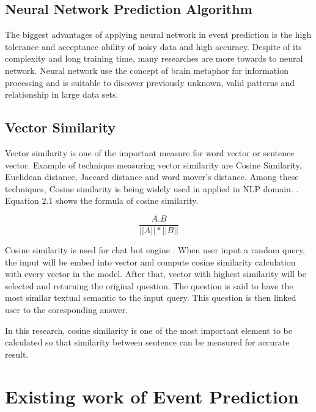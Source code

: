\documentclass[twoside]{utmthesis}
\begin{document}
\subsection{Neural Network Prediction Algorithm}
The biggest advantages of applying neural network in event prediction is the high tolerance and acceptance ability of noisy data and high accuracy. Despite of its complexity and long training time, many researches are more towards to neural network.\citep{granroth2016happens,hu2017happens,asencio2017medium} Neural network use the concept of brain metaphor for information processing and is suitable to discover previously unknown, valid patterns and relationship in large data sets. \citep{gaur2012neural}

\subsection{Vector Similarity}
Vector similarity is one of the important measure for word vector or sentence vector. Example of technique measuring vector similarity are Cosine Similarity, Euclidean distance, Jaccard distance and word mover's distance. Among these techniques, Cosine similarity is being widely used in applied in NLP domain. \citep{torabi-asr-etal-2018-querying, mikolov2013distributed, bekkali2019effective}. Equation 2.1 shows the formula of cosine similarity.

\begin{equation}
\frac{A.B}{||A|| * ||B||}
\end{equation}

Cosine similarity is used for chat bot engine \citep{yang2018learning}. When user input a random query, the input will be embed into vector and compute cosine similarity calculation with every vector in the model. After that, vector with highest similarity will be selected and returning the original question. The question is said to have the most similar textual semantic to the input query. This question is then linked user to the coresponding answer. 

In this research, cosine similarity is one of the most important element to be calculated so that similarity between sentence can be measured for accurate result.   




\section{Existing work of Event Prediction}
\end{document}
